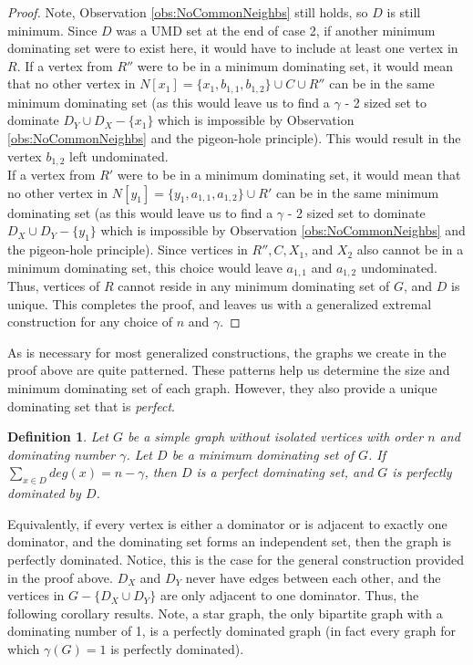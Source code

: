 \documentclass[12pt]{amsart}
\newcommand{\rc}[1]{\textcolor{red}{#1}}
\newtheorem{defn}[thm]{Definition}
\begin{document}
\begin{proof}
Note, Observation \ref{obs:NoCommonNeighbs} still holds, so $D$ is still minimum. Since $D$ was a UMD set at the end of case 2, if another minimum dominating set were to exist here, it would have to include at least one vertex in $R$. If a vertex from $R''$ were to be in a minimum dominating set, it would mean that no other vertex in $N[x_1] = \{x_1,b_{1,1},b_{1,2}\} \cup C \cup R''$ can be in the same minimum dominating set (as this would leave us to find a $\gamma$ - 2 sized set to dominate $ D_Y \cup D_X - \{x_1\}$ which is impossible by Observation \ref{obs:NoCommonNeighbs} and the pigeon-hole principle). This would result in the vertex $b_{1,2}$ left undominated.\\
If a vertex from $R'$ were to be in a minimum dominating set, it would mean that no other vertex in $N[y_1] = \{y_1,a_{1,1},a_{1,2}\} \cup R'$ can be in the same minimum dominating set (as this would leave us to find a $\gamma$ - 2 sized set to dominate $ D_X \cup D_Y - \{y_1\}$ which is impossible by Observation \ref{obs:NoCommonNeighbs} and the pigeon-hole principle). Since vertices in $R'', C,X_1$, and $X_2$ also cannot be in a minimum dominating set, this choice would leave $a_{1,1}$ and $a_{1,2}$ undominated. Thus, vertices of $R$ cannot reside in any minimum dominating set of $G$, and $D$ is unique. This completes the proof, and leaves us with a generalized extremal construction for any choice of $n$ and $\gamma$.
\end{proof}
As is necessary for most generalized constructions, the graphs we create in the proof above are quite patterned. These patterns help us determine the size and minimum dominating set of each graph. However, they also provide a unique dominating set that is \textit{perfect}.
\begin{defn}\label{defn:PerfecrDom}
    Let $G$ be a simple graph without isolated vertices with order $n$ and dominating number $\gamma$. Let $D$ be a minimum dominating set of $G$. If $\sum_{x \in D} deg(x) = n - \gamma$, then $D$ is a perfect dominating set, and $G$ is perfectly dominated by $D$.
\end{defn}
Equivalently, if every vertex is either a dominator or is adjacent to exactly one dominator, and the dominating set forms an independent set, then the graph is perfectly dominated. Notice, this is the case for the general construction provided in the proof above. $D_X$ and $D_Y$ never have edges between each other, and the vertices in $G - \{D_X \cup D_Y\}$ are only adjacent to one dominator. Thus, the following corollary results. Note, a star graph, the only bipartite graph with a dominating number of 1, is a perfectly dominated graph (in fact every graph for which $\gamma(G) = 1$ is perfectly dominated).
\end{document}
